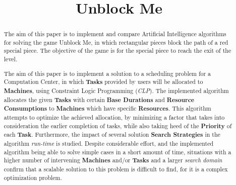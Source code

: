 \documentclass[conference]{IEEEtran}
\begin{document}
\title{Unblock Me}

\author{
\and
{}
\and
{}
}

\maketitle

\begin{abstract}
The aim of this paper is to implement and compare Artificial Intelligence algorithms for solving the game Unblock Me, in which rectangular pieces block the path of a red special piece. The objective of the game is for the special piece to reach the exit of the level.

The aim of this paper is to implement a solution to a scheduling problem for a Computation Center, in which \textbf{Tasks} provided by users will be allocated to \textbf{Machines}, using Constraint Logic Programming (\textit{CLP}).
The implemented algorithm allocates the given \textbf{Tasks} with certain \textbf{Base Durations} and \textbf{Resource Consumptions} to \textbf{Machines} which have specific \textbf{Resources}.
This algorithm attempts to optimize the achieved allocation, by minimizing a factor that takes into consideration the earlier completion of tasks, while also taking heed of the \textbf{Priority} of each \textbf{Task}. Furthermore, the impact of several solution \textbf{Search Strategies} in the algorithm \textit{run-time} is studied.
Despite considerable effort, and the implemented algorithm being able to solve simple cases in a short amount of time, situations with a higher number of intervening \textbf{Machines} and/or \textbf{Tasks} and a larger \textit{search domain} confirm that a scalable solution to this problem is difficult to find, for it is a complex optimization problem.
\end{abstract}
\end{document}
